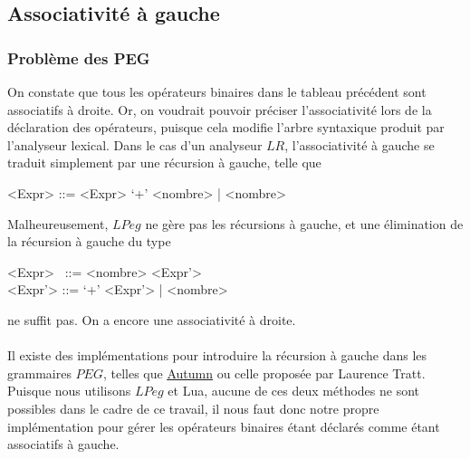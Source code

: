 \documentclass{article}
\begin{document}
\subsection{Associativité à gauche}
\subsubsection{Problème des PEG}
On constate que tous les opérateurs binaires dans le tableau précédent sont associatifs à droite. Or, on voudrait pouvoir préciser l'associativité lors de la déclaration des opérateurs, puisque cela modifie l'arbre syntaxique produit par l'analyseur lexical. Dans le cas d'un analyseur $LR$, l'associativité à gauche se traduit simplement par une récursion à gauche, telle que
\begin{grammar}
	<Expr> ::= <Expr> `+' <nombre> | <nombre>
\end{grammar}
Malheureusement, $LPeg$ ne gère pas les récursions à gauche, et une élimination de la récursion à gauche du type
\begin{grammar}
<Expr> \ ::= <nombre> <Expr'> \\
<Expr'> ::= `+' <Expr'> | <nombre>
\end{grammar}
ne suffit pas. On a encore une associativité à droite. \\ \\
Il existe des implémentations pour introduire la récursion à gauche dans les grammaires $PEG$, telles que \underline{\href{https://github.com/norswap/whimsy/blob/master/doc/autumn/README.md}{Autumn}}\textsuperscript{\cite{autumn}} ou celle proposée par Laurence Tratt\textsuperscript{\cite{directLeftRecursive}}. Puisque nous utilisons $LPeg$ et Lua, aucune de ces deux méthodes ne sont possibles dans le cadre de ce travail, il nous faut donc notre propre implémentation pour gérer les opérateurs binaires étant déclarés comme étant associatifs à gauche.
\end{document}

